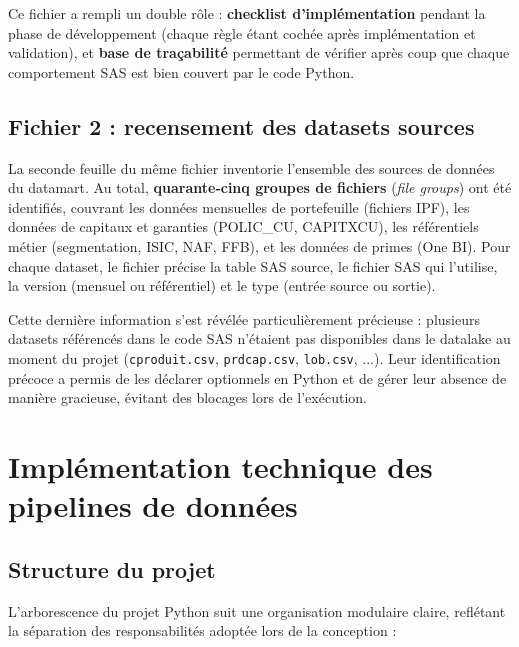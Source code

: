 Ce fichier a rempli un double rôle : \textbf{checklist d'implémentation} pendant la phase de développement (chaque règle étant cochée après implémentation et validation), et \textbf{base de traçabilité} permettant de vérifier après coup que chaque comportement SAS est bien couvert par le code Python.

\subsection{Fichier 2 : recensement des datasets sources}

La seconde feuille du même fichier inventorie l'ensemble des sources de données du datamart. Au total, \textbf{quarante-cinq groupes de fichiers} (\textit{file groups}) ont été identifiés, couvrant les données mensuelles de portefeuille (fichiers IPF), les données de capitaux et garanties (POLIC\_CU, CAPITXCU), les référentiels métier (segmentation, ISIC, NAF, FFB), et les données de primes (One BI). Pour chaque dataset, le fichier précise la table SAS source, le fichier SAS qui l'utilise, la version (mensuel ou référentiel) et le type (entrée source ou sortie).

Cette dernière information s'est révélée particulièrement précieuse : plusieurs datasets référencés dans le code SAS n'étaient pas disponibles dans le datalake au moment du projet (\texttt{cproduit.csv}, \texttt{prdcap.csv}, \texttt{lob.csv}, ...). Leur identification précoce a permis de les déclarer optionnels en Python et de gérer leur absence de manière gracieuse, évitant des blocages lors de l'exécution.

\section{Implémentation technique des pipelines de données}

\subsection{Structure du projet}

L'arborescence du projet Python suit une organisation modulaire claire, reflétant la séparation des responsabilités adoptée lors de la conception :

